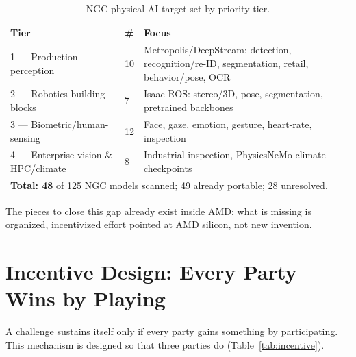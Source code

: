 \documentclass[blind]{gtac}
\begin{document}
\begin{table}[H]
\centering
\caption{NGC physical-AI target set by priority tier.}
\label{tab:tiers}
\tiny
\begin{tabular}{@{}p{0.75in}p{0.2in}p{1.55in}@{}}
\toprule
Tier & \# & Focus \\
\midrule
1 --- Production perception & 10 & Metropolis/DeepStream: detection, recognition/re-ID, segmentation, retail, behavior/pose, OCR \\
2 --- Robotics building blocks & 7 & Isaac ROS: stereo/3D, pose, segmentation, pretrained backbones \\
3 --- Biometric/human-sensing & 12 & Face, gaze, emotion, gesture, heart-rate, inspection \\
4 --- Enterprise vision \& HPC/climate & 8 & Industrial inspection, PhysicsNeMo climate checkpoints \\
\bottomrule
\multicolumn{3}{l}{\textbf{Total: 48} of 125 NGC models scanned; 49 already portable; 28 unresolved.} \\
\end{tabular}
\end{table}

The pieces to close this gap already exist inside AMD; what is missing is organized, incentivized effort pointed at AMD silicon, not new invention.

\section{Incentive Design: Every Party Wins by Playing}
\label{sec:incentive}

A challenge sustains itself only if every party gains something by participating. This mechanism is designed so that three parties do (Table~\ref{tab:incentive}).
\end{document}
